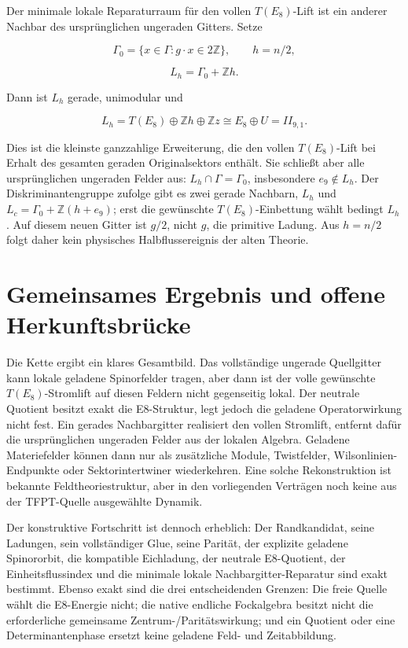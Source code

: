 \documentclass[11pt,a4paper,oneside,parskip=half,headings=normal,numbers=noenddot,bibliography=totoc]{scrreprt}
\begin{document}
Der minimale lokale Reparaturraum für den vollen \(T(E_8)\)-Lift ist ein anderer Nachbar des ursprünglichen ungeraden Gitters. Setze

\[
\Gamma_0=\{x\in\Gamma:g\cdot x\in2\mathbb Z\},\qquad h=n/2,
\]

\[
L_h=\Gamma_0+\mathbb Zh.
\]

Dann ist \(L_h\) gerade, unimodular und

\[
L_h=T(E_8)\oplus\mathbb Zh\oplus\mathbb Zz
\cong E_8\oplus U=II_{9,1}.
\]

Dies ist die kleinste ganzzahlige Erweiterung, die den vollen \(T(E_8)\)-Lift bei Erhalt des gesamten geraden Originalsektors enthält. Sie schließt aber alle ursprünglichen ungeraden Felder aus: \(L_h\cap\Gamma=\Gamma_0\), insbesondere \(e_9\notin L_h\). Der Diskriminantengruppe zufolge gibt es zwei gerade Nachbarn, \(L_h\) und \(L_c=\Gamma_0+\mathbb Z(h+e_9)\); erst die gewünschte \(T(E_8)\)-Einbettung wählt bedingt \(L_h\). Auf diesem neuen Gitter ist \(g/2\), nicht \(g\), die primitive Ladung. Aus \(h=n/2\) folgt daher kein physisches Halbflussereignis der alten Theorie.

\section{Gemeinsames Ergebnis und offene Herkunftsbrücke}

Die Kette ergibt ein klares Gesamtbild. Das vollständige ungerade Quellgitter kann lokale geladene Spinorfelder tragen, aber dann ist der volle gewünschte \(T(E_8)\)-Stromlift auf diesen Feldern nicht gegenseitig lokal. Der neutrale Quotient besitzt exakt die E8-Struktur, legt jedoch die geladene Operatorwirkung nicht fest. Ein gerades Nachbargitter realisiert den vollen Stromlift, entfernt dafür die ursprünglichen ungeraden Felder aus der lokalen Algebra. Geladene Materiefelder können dann nur als zusätzliche Module, Twistfelder, Wilsonlinien-Endpunkte oder Sektorintertwiner wiederkehren. Eine solche Rekonstruktion ist bekannte Feldtheoriestruktur, aber in den vorliegenden Verträgen noch keine aus der TFPT-Quelle ausgewählte Dynamik.

Der konstruktive Fortschritt ist dennoch erheblich: Der Randkandidat, seine Ladungen, sein vollständiger Glue, seine Parität, der explizite geladene Spinororbit, die kompatible Eichladung, der neutrale E8-Quotient, der Einheitsflussindex und die minimale lokale Nachbargitter-Reparatur sind exakt bestimmt. Ebenso exakt sind die drei entscheidenden Grenzen: Die freie Quelle wählt die E8-Energie nicht; die native endliche Fockalgebra besitzt nicht die erforderliche gemeinsame Zentrum-/Paritätswirkung; und ein Quotient oder eine Determinantenphase ersetzt keine geladene Feld- und Zeitabbildung.
\end{document}
